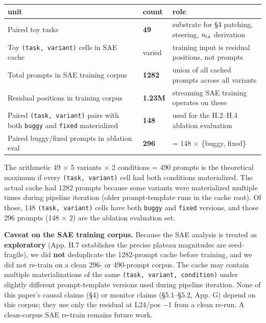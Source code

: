 \documentclass[
  11pt,
  a4paper]{article}
\newcounter{none} %
\begin{document}
{\def\LTcaptype{none} %
\begin{longtable}[]{@{}
  >{\raggedright\arraybackslash}p{}
  >{\raggedleft\arraybackslash}p{}
  >{\raggedright\arraybackslash}p{}@{}}
\toprule\noalign{}
\begin{minipage}[b]{\linewidth}\raggedright
unit
\end{minipage} & \begin{minipage}[b]{\linewidth}\raggedleft
count
\end{minipage} & \begin{minipage}[b]{\linewidth}\raggedright
role
\end{minipage} \\
\midrule\noalign{}
\endhead
\bottomrule\noalign{}
\endlastfoot
Paired toy tasks & \textbf{49} & substrate for \S{}4 patching, steering,
\(u_{\rm tx}\) derivation \\
Toy \texttt{(task,\ variant)} cells in SAE cache & varied & training
input is residual positions, not prompts \\
Total prompts in SAE training corpus & \textbf{1282} & union of all
cached prompts across all variants \\
Residual positions in training corpus & \textbf{1.23M} & streaming SAE
training operates on these \\
Paired \texttt{(task,\ variant)} pairs with both \texttt{buggy} and
\texttt{fixed} materialized & \textbf{148} & used for the H.2--H.4
ablation evaluation \\
Paired buggy/fixed prompts in ablation eval & \textbf{296} & = 148 \ensuremath{\times}
\{buggy, fixed\} \\
\end{longtable}
}

The arithmetic 49 \ensuremath{\times} 5 variants \ensuremath{\times} 2 conditions = 490 prompts is the
theoretical maximum if every \texttt{(task,\ variant)} cell had both
conditions materialized. The actual cache had 1282 prompts because some
variants were materialized multiple times during pipeline iteration
(older prompt-template runs in the cache root). Of those, 148
\texttt{(task,\ variant)} cells have both \texttt{buggy} and
\texttt{fixed} versions, and those 296 prompts (148 \ensuremath{\times} 2) are the
ablation evaluation set.

\textbf{Caveat on the SAE training corpus.} Because the SAE analysis is
treated as \textbf{exploratory} (App. H.7 establishes the precise
plateau magnitudes are seed-fragile), we did \textbf{not} deduplicate
the 1282-prompt cache before training, and we did not re-train on a
clean 296- or 490-prompt corpus. The cache may contain multiple
materializations of the same \texttt{(task,\ variant,\ condition)} under
slightly different prompt-template versions used during pipeline
iteration. None of this paper's causal claims (\S{}4) or monitor claims
(\S{}5.1--\S{}5.2, App. G) depend on this corpus; they use only the residual
at L24/pos \ensuremath{-}1 from a clean re-run. A clean-corpus SAE re-train remains
future work.
\end{document}
